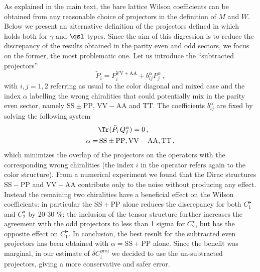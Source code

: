 \documentclass[aps,prd,twocolumn,nofootinbib,showpacs,superscriptaddress]{revtex4-1}
\begin{document}
As explained in the main text, the bare lattice Wilson coefficients
can be obtained from any reasonable choice of projectors in the 
definition of $M$ and $W$.
Below we present an alternative definition of the projectors defined
in  which holds both for $\gamma$ and $\qsl$ types.
Since the aim of this digression is to reduce the discrepancy of the 
results obtained in the parity even and odd sectors, we focus
on the former, the most problematic one.
Let us introduce the ``subtracted projectors'' 
\begin{equation}
\tilde P_i = P_i^\mathrm{VV+AA} + b_{ij}^\alpha P_j^\alpha \,,
\end{equation}
with $i,j=1,2$ referring as usual to the color diagonal and mixed case
and the index $\alpha$ labelling the wrong chiralities that could potentially
mix in the parity even sector, namely $\mathrm{SS} \pm \mathrm{PP}$,
$\mathrm{VV}-\mathrm{AA}$ and $\mathrm{TT}$. 
The coefficients $b_{ij}^\alpha$ are fixed by solving the following
system 
\begin{equation}
\begin{split}
&\Tr ( \tilde P_i \, Q_j^\alpha ) = 0 \,, \\
\alpha=&\, \mathrm{SS}  \pm \mathrm{PP}, \mathrm{VV}-\mathrm{AA}, \mathrm{TT} \,,
\end{split}
\end{equation}
which minimizes the overlap of the projectors on the operators with the 
corresponding wrong chiralities (the index $i$ in the operator refers 
again to the color structure).
From a numerical experiment we found that the Dirac structures
$\mathrm{SS} - \mathrm{PP}$ and $\mathrm{VV}-\mathrm{AA}$ contribute
only to the noise without producing any effect.
Instead the remaining two chiralities have a beneficial effect
on the Wilson coefficients: in particular the $\mathrm{SS} + \mathrm{PP}$
alone reduces the discrepancy for both $C_1^\lat$ and $C_2^\lat$ by 20-30 \%; 
the inclusion of the tensor structure further increases the agreement 
with the odd projectors to less than 1 sigma for $C_2^\lat$, but 
has the opposite effect on $C_1^\lat$. In conclusion, the best result 
for the subtracted even projectors has been obtained with 
$\alpha = \mathrm{SS} + \mathrm{PP}$ alone. Since the benefit was marginal, 
in our estimate of $\delta C_i^\mathrm{proj}$
we decided
to use the un-subtracted projectors,
giving a more conservative and safer error.



\end{document}
